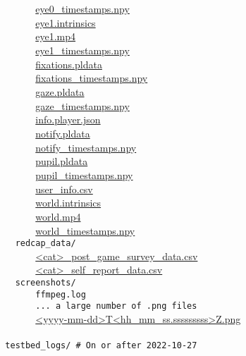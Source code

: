 \verb|        |\hyperref[eye0_timestamps.npy]{eye0\_timestamps.npy}\\
\verb|        |\hyperref[eye1.intrinsics]{eye1.intrinsics}\\
\verb|        |\hyperref[eye1.mp4]{eye1.mp4}\\
\verb|        |\hyperref[eye1_timestamps.npy]{eye1\_timestamps.npy}\\
\verb|        |\hyperref[fixations.pldata]{fixations.pldata}\\
\verb|        |\hyperref[fixations_timestamps.npy]{fixations\_timestamps.npy}\\
\verb|        |\hyperref[gaze.pldata]{gaze.pldata}\\
\verb|        |\hyperref[gaze_timestamps.npy]{gaze\_timestamps.npy}\\
\verb|        |\hyperref[info.player.json]{info.player.json}\\
\verb|        |\hyperref[notify.pldata]{notify.pldata}\\
\verb|        |\hyperref[notify_timestamps.npy]{notify\_timestamps.npy}\\
\verb|        |\hyperref[pupil.pldata]{pupil.pldata}\\
\verb|        |\hyperref[pupil_timestamps.npy]{pupil\_timestamps.npy}\\
\verb|        |\hyperref[user_info.csv]{user\_info.csv}\\
\verb|        |\hyperref[world.intrinsics]{world.intrinsics}\\
\verb|        |\hyperref[world.mp4]{world.mp4}\\
\verb|        |\hyperref[world_timestamps.npy]{world\_timestamps.npy}\\
\verb|    redcap_data/|\\
\verb|        |\hyperref[<cat>_post_game_survey_data.csv]{<cat>\_post\_game\_survey\_data.csv}\\
\verb|        |\hyperref[<cat>_self_report_data.csv]{<cat>\_self\_report\_data.csv}\\
\verb|    screenshots/|\\
\verb|        ffmpeg.log|\\
\verb|        ... a large number of .png files|\\
\verb|        |\hyperref[screenshots/<yyyy-mm-dd>T<hh_mm_ss.sssssssss>Z.png]{<yyyy-mm-dd>T<hh\_mm\_ss.sssssssss>Z.png}\\\\
\verb|  testbed_logs/ # On or after 2022-10-27|\\
